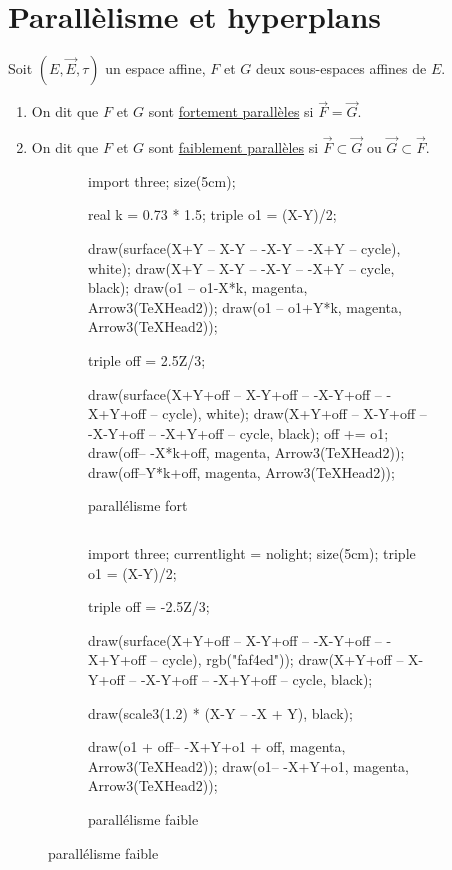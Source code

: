 \part{Parallèlisme et hyperplans}

\begin{defn}
	Soit $\left( E, \vec{E}, \tau \right)$ un espace affine, $F$ et $G$ deux sous-espaces affines de $E$.

	\begin{enumerate}
		\item On dit que $F$ et $G$ sont \underline{fortement parallèles} si $\vec{F} = \vec{G}$.
		\item On dit que $F$ et $G$ sont \underline{faiblement parallèles} si $\vec{F} \subset \vec{G}$ ou $\vec{G} \subset \vec{F}$.
	\end{enumerate}
\end{defn}

\begin{figure}[H]
	\centering
	\begin{subfigure}{5cm}
		\centering
		\begin{asy}
			import three;
			size(5cm);
	
			real k = 0.73 * 1.5;
			triple o1 = (X-Y)/2;

			draw(surface(X+Y -- X-Y -- -X-Y -- -X+Y -- cycle), white);
			draw(X+Y -- X-Y -- -X-Y -- -X+Y -- cycle, black);
			draw(o1 -- o1-X*k, magenta, Arrow3(TeXHead2));
			draw(o1 -- o1+Y*k, magenta, Arrow3(TeXHead2));
	

			triple off = 2.5Z/3;

			draw(surface(X+Y+off -- X-Y+off -- -X-Y+off -- -X+Y+off -- cycle), white);
			draw(X+Y+off -- X-Y+off -- -X-Y+off -- -X+Y+off -- cycle, black);
			off += o1;
			draw(off-- -X*k+off, magenta, Arrow3(TeXHead2));
			draw(off--Y*k+off, magenta, Arrow3(TeXHead2));
		\end{asy}
		\caption{parallélisme fort}
	\end{subfigure}
	$\qquad$
	\begin{subfigure}{5cm}
		\centering
		\begin{asy}
			import three;
			currentlight = nolight;
			size(5cm);
			triple o1 = (X-Y)/2;

			triple off = -2.5Z/3;

			draw(surface(X+Y+off -- X-Y+off -- -X-Y+off -- -X+Y+off -- cycle), rgb("faf4ed"));
			draw(X+Y+off -- X-Y+off -- -X-Y+off -- -X+Y+off -- cycle, black);

			draw(scale3(1.2) * (X-Y -- -X + Y), black);
	
			draw(o1 + off-- -X+Y+o1 + off, magenta, Arrow3(TeXHead2));
			draw(o1-- -X+Y+o1, magenta, Arrow3(TeXHead2));
		\end{asy}
		\caption{parallélisme faible}
	\end{subfigure}
\end{figure}

